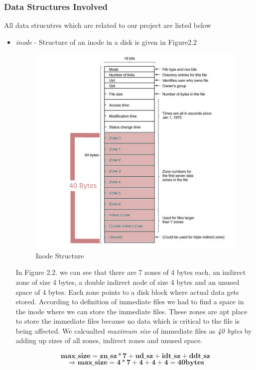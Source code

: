 \subsubsection{Data Structures Involved}
All data strucutres which are related to our project are listed below
\begin{itemize}
  \item \emph{inode} - Structure of an inode in a disk is given in Figure2.2
  \begin{figure}[!htb]
    \centering
    \includegraphics[scale=0.6]{img/inode.png}
    \caption{Inode Structure}
\end{figure} 


In Figure 2.2. we can see that there are 7 zones of 4 bytes each, an indirect
zone of size 4 bytes, a double indirect node of size 4 bytes and an unused space
of 4 bytes. Each zone points to a disk block where actual data gets stored. According
to definition of immediate files we had to find a space in the inode where we
can store the immediate files. These zones are apt place to store the immediate
files because no data which is critical to the file is being affected. We
calcualted \emph{maximum size} of immediate files as \emph{40 bytes} by adding
up sizes of all zones, indirect zones and unused space.

\begin{equation}
\boldsymbol{max\_size = zn\_sz * 7 + ud\_sz + idt\_sz + ddt\_sz} 
\end{equation}
\begin{equation}
\boldsymbol{\Rightarrow max\_size = 4 * 7 + 4 + 4 + 4 = 40 bytes}
\end{equation}


\end{itemize}
